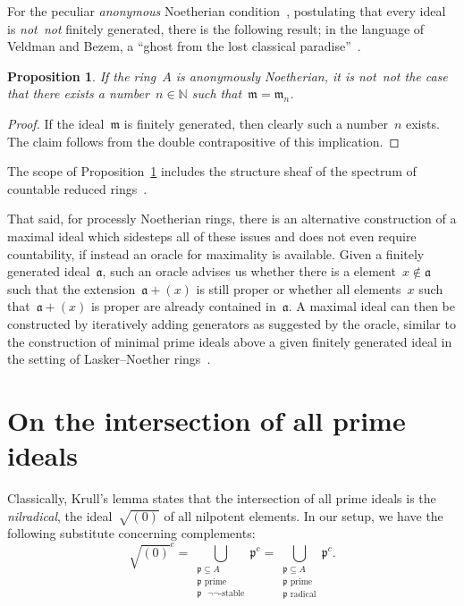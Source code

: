 \documentclass[com,11pt,crcready]{iosart2x}
\theoremstyle{definition}
\theoremstyle{plain}
\newtheorem{proposition}[definition]{Proposition}
\theoremstyle{remark}
\newcommand{\aaa}{\mathfrak{a}}
\newcommand{\mmm}{\mathfrak{m}}
\newcommand{\ppp}{\mathfrak{p}}
\newcommand{\NN}{\mathbb{N}}
\renewcommand{\_}{\mathpunct{.}\,}
\begin{document}
For the peculiar \emph{anonymous} Noetherian condition~\cite[Definition~3.27]{blechschmidt:phd}, postulating that every
ideal is \emph{not~not} finitely generated, there is the following result;
in the language of Veldman and Bezem, a ``ghost from the lost classical
paradise''~\cite[Section~5.1]{veldman-bezem:ramsey}.

\begin{proposition}\label{prop:fin-anon}If the ring~$A$ is anonymously
Noetherian, it is \emph{not~not} the case that there exists a number~$n \in
\NN$ such that~$\mmm = \mmm_n$.\end{proposition}

\begin{proof}If the ideal~$\mmm$ is finitely generated, then clearly such a
number~$n$ exists. The claim follows from the double contrapositive of this
implication.
\end{proof}

The scope of Proposition~\ref{prop:fin-anon} includes the structure sheaf of
the spectrum of countable reduced
rings~\cite[Proposition~34]{blechschmidt:generalized-spaces}.

That said, for processly Noetherian rings, there is an alternative
construction of a maximal ideal which sidesteps all of these issues and does
not even require countability, if instead an oracle for maximality is available.
Given a finitely generated ideal~$\aaa$, such an oracle advises us whether there is a
element~$x \not\in \aaa$ such that the extension~$\aaa + (x)$ is still proper
or whether all elements~$x$ such that~$\aaa + (x)$ is proper are already
contained in~$\aaa$. A maximal ideal can then be constructed by iteratively
adding generators as suggested by the oracle, similar to the construction of
minimal prime ideals above a given finitely generated ideal in the setting of
Lasker--Noether rings~\cite[Theorem~E]{perdry:noetherian}.


\section{On the intersection of all prime ideals}
\label{sect:krull}

Classically, Krull's lemma states that the intersection of all prime ideals is the
\emph{nilradical}, the ideal~$\sqrt{(0)}$ of all nilpotent elements. In our
setup, we have the following substitute concerning complements:
\[ \sqrt{(0)}^c =
  \bigcup_{\substack{\text{$\ppp \subseteq A$}\\\text{$\ppp$ prime}\\\text{$\ppp$ $\neg\neg$-stable}}} \ppp^c =
  \bigcup_{\substack{\text{$\ppp \subseteq A$}\\\text{$\ppp$ prime}\\\text{$\ppp$ radical}}} \ppp^c. \]
\end{document}
